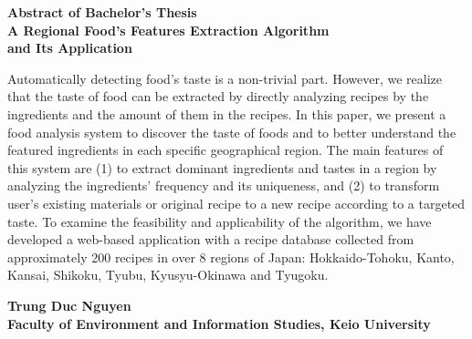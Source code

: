 \begin{center}

\begin{Large}
{\bf Abstract of Bachelor's Thesis} \\

\vspace{5mm}
{\bf A Regional Food's Features Extraction Algorithm\\ and Its Application}

\end{Large}
\end{center}

\vspace{0.4cm}
Automatically detecting food's taste is a non-trivial part. However, we realize that the taste of food can be extracted by directly analyzing recipes by the ingredients and the amount of them in the recipes. 
In this paper, we present a food analysis system to discover the taste of foods and to better understand the featured ingredients in each specific geographical region. The main features of this system are (1) to extract dominant ingredients and tastes in a region by analyzing the ingredients' frequency and its uniqueness, and (2) to transform user's existing materials or original recipe to a new recipe according to a targeted taste. To examine the feasibility and applicability of the algorithm, we have developed a web-based application with a recipe database collected from approximately 200 recipes in over 8 regions of Japan: Hokkaido-Tohoku, Kanto, Kansai, Shikoku, Tyubu, Kyusyu-Okinawa and Tyugoku. 
\vspace{-2.5mm}

\begin{flushright}
{\bf Trung Duc Nguyen}\\
\vspace{-2mm}
{\bf Faculty of Environment and Information Studies, Keio University}\\
\end{flushright}




